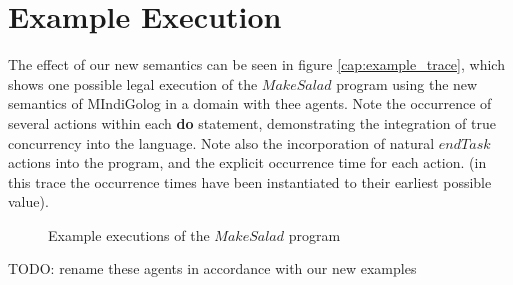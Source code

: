 \section{Example Execution\label{sec:MIndiGolog:Example-Execution}}

The effect of our new semantics can be seen in figure \ref{cap:example_trace},
which shows one possible legal execution of the $MakeSalad$ program
using the new semantics of MIndiGolog in a domain with thee agents.
Note the occurrence of several actions within each \textbf{do} statement,
demonstrating the integration of true concurrency into the language.
Note also the incorporation of natural $endTask$ actions into the
program, and the explicit occurrence time for each action. (in this
trace the occurrence times have been instantiated to their earliest
possible value).

%
\begin{figure*}[t]
 \centering {} 

\caption{Example executions of the $MakeSalad$ program}

\end{figure*}


TODO: rename these agents in accordance with our new examples

